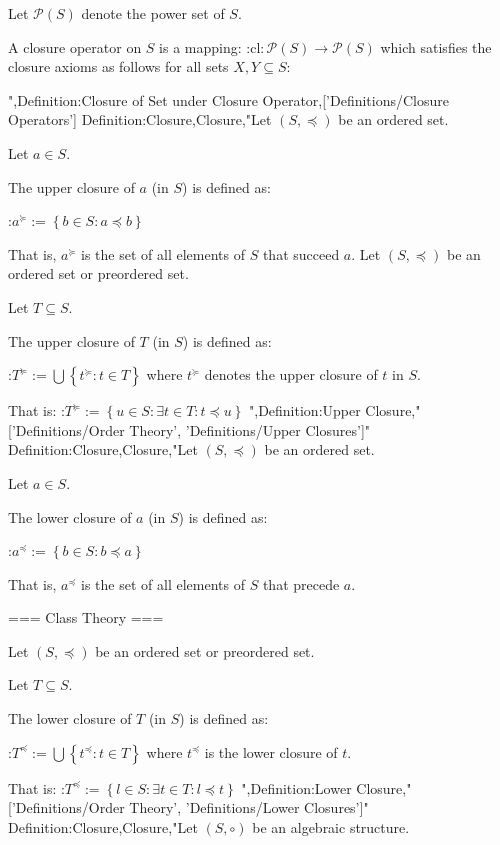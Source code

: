 Let $\mathcal P \left( S \right)$ denote the power set of $S$.


A closure operator on $S$ is a mapping:
:$\mathrm {cl}: \mathcal P \left( S \right) \to \mathcal P \left( S \right)$
which satisfies the closure axioms as follows for all sets $X, Y \subseteq S$:

",Definition:Closure of Set under Closure Operator,['Definitions/Closure Operators']
Definition:Closure,Closure,"Let $\left( S, \preccurlyeq \right)$ be an ordered set.

Let $a \in S$.


The upper closure of $a$ (in $S$) is defined as:

:$a^\succcurlyeq := \left\lbrace b \in S: a \preccurlyeq b \right\rbrace$


That is, $a^\succcurlyeq$ is the set of all elements of $S$ that succeed $a$.
Let $\left( S, \preceq \right)$ be an ordered set or preordered set.

Let $T \subseteq S$.


The upper closure of $T$ (in $S$) is defined as:

:$T^\succeq := \bigcup \left\lbrace t^\succeq: t \in T \right\rbrace$
where $t^\succeq$ denotes the upper closure of $t$ in $S$.

That is:
:$T^\succeq := \left\lbrace u \in S: \exists t \in T: t \preceq u \right\rbrace$
",Definition:Upper Closure,"['Definitions/Order Theory', 'Definitions/Upper Closures']"
Definition:Closure,Closure,"Let $\left( S, \preccurlyeq \right)$ be an ordered set.

Let $a \in S$.


The lower closure of $a$ (in $S$) is defined as:

:$a^\preccurlyeq := \left\lbrace b \in S: b \preccurlyeq a \right\rbrace$


That is, $a^\preccurlyeq$ is the set of all elements of $S$ that precede $a$.


=== Class Theory ===


Let $\left( S, \preccurlyeq \right)$ be an ordered set or preordered set.

Let $T \subseteq S$.


The lower closure of $T$ (in $S$) is defined as:

:$T^\preccurlyeq := \bigcup \left\lbrace t^\preccurlyeq: t \in T \right\rbrace$
where $t^\preccurlyeq$ is the lower closure of $t$.

That is:
:$T^\preccurlyeq := \left\lbrace l \in S: \exists t \in T: l \preccurlyeq t \right\rbrace$
",Definition:Lower Closure,"['Definitions/Order Theory', 'Definitions/Lower Closures']"
Definition:Closure,Closure,"Let $\left( S, \circ \right)$ be an algebraic structure.


